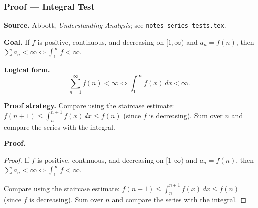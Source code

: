 
\clearpage
{}
\hypertarget{proof-RA-ABB-T-integral-test}{}

\subsubsection[Integral Test]{Proof --- Integral Test}

\bigskip

\noindent
\textbf{Source.} Abbott, \emph{Understanding Analysis}; see \texttt{notes-series-tests.tex}.

\vspace{0.75em}

\noindent
\textbf{Goal.} If $f$ is positive, continuous, and decreasing on $[1,\infty)$ and $a_n = f(n)$, then $\sum a_n < \infty \Leftrightarrow \int_1^\infty f < \infty$.

\vspace{0.75em}

\noindent
\textbf{Logical form.}
\[
  \sum_{n=1}^\infty f(n) < \infty \Longleftrightarrow \int_1^\infty f(x)\,dx < \infty.
\]

\vspace{0.75em}

\noindent
\textbf{Proof strategy.} Compare using the staircase estimate: $f(n+1) \le \int_n^{n+1} f(x)\,dx \le f(n)$ (since $f$ is decreasing). Sum over $n$ and compare the series with the integral.

\vspace{0.75em}

\noindent
\textbf{Proof.}
\begin{proof}
\Claim If $f$ is positive, continuous, and decreasing on $[1,\infty)$ and $a_n = f(n)$, then $\sum a_n < \infty \Leftrightarrow \int_1^\infty f < \infty$.

\Given 

\Goal 

\Strategy Compare using the staircase estimate: $f(n+1) \le \int_n^{n+1} f(x)\,dx \le f(n)$ (since $f$ is decreasing). Sum over $n$ and compare the series with the integral.

\medskip


\end{proof}

